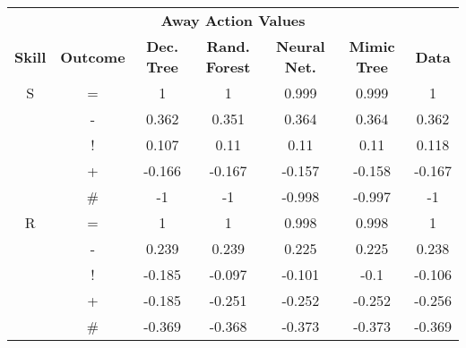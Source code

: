\documentclass{sfuthesis}
\begin{document}
	\begin{table}
		\centering
		\begin{tabular}{ccccccc}
			\multicolumn{7}{c}{\textbf{Away Action Values}}                                                                                                                                       \\
			\textbf{Skill} & \multicolumn{1}{c|}{\textbf{Outcome}} & \textbf{Dec. Tree} & \textbf{Rand. Forest} & \textbf{Neural Net.} & \multicolumn{1}{c|}{\textbf{Mimic Tree}} & \textbf{Data} \\ \hline
			S              & \multicolumn{1}{c|}{=}                & 1                  & 1                     & 0.999                & \multicolumn{1}{c|}{0.999}               & 1             \\
			& \multicolumn{1}{c|}{-}                & 0.362              & 0.351                 & 0.364                & \multicolumn{1}{c|}{0.364}               & 0.362         \\
			& \multicolumn{1}{c|}{!}                & 0.107              & 0.11                  & 0.11                 & \multicolumn{1}{c|}{0.11}                & 0.118         \\
			& \multicolumn{1}{c|}{+}                & -0.166             & -0.167                & -0.157               & \multicolumn{1}{c|}{-0.158}              & -0.167        \\
			& \multicolumn{1}{c|}{\#}               & -1                 & -1                    & -0.998               & \multicolumn{1}{c|}{-0.997}              & -1            \\ \hline
			R              & \multicolumn{1}{c|}{=}                & 1                  & 1                     & 0.998                & \multicolumn{1}{c|}{0.998}               & 1             \\
			& \multicolumn{1}{c|}{-}                & 0.239              & 0.239                 & 0.225                & \multicolumn{1}{c|}{0.225}               & 0.238         \\
			& \multicolumn{1}{c|}{!}                & -0.185             & -0.097                & -0.101               & \multicolumn{1}{c|}{-0.1}                & -0.106        \\
			& \multicolumn{1}{c|}{+}                & -0.185             & -0.251                & -0.252               & \multicolumn{1}{c|}{-0.252}              & -0.256        \\
			& \multicolumn{1}{c|}{\#}               & -0.369             & -0.368                & -0.373               & \multicolumn{1}{c|}{-0.373}              & -0.369        \\ \hline

\end{tabular}
\end{table}
\end{document}
